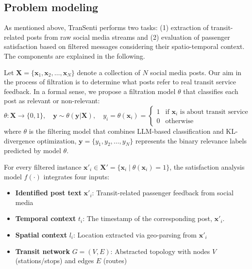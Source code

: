 \documentclass[a4paper,fleqn,12pt]{cas-sc}
\begin{document}
\subsection{Problem modeling}\label{sec:preliminaries}
As mentioned above, TranSenti performs two tasks: (1) extraction of transit-related posts from raw social media streams and (2) evaluation of passenger satisfaction based on filtered messages considering their spatio-temporal context. The components are explained in the following.

Let $\boldsymbol{X} = \{\boldsymbol{x}_1, \boldsymbol{x}_2, \ldots, \boldsymbol{x}_N\}$ denote a collection of $N$ social media posts. Our aim in the process of filtration is to determine what posts refer to real transit service feedback. In a formal sense, we propose a filtration model $\theta$ that classifies each post as relevant or non-relevant:
\begin{equation}
\theta: \boldsymbol{X} \rightarrow \{0,1\}, \quad \boldsymbol{y}\sim\theta(\boldsymbol{y}|\boldsymbol{X}),\quad y_{i}=\theta(\boldsymbol{x}_{i}) = 
\begin{cases} 
1 & \text{if } \boldsymbol{x}_{i} \text{ is about transit service} \\
0 & \text{otherwise}
\end{cases}
\end{equation}
where \(\theta\) is the filtering model that combines LLM-based classification and KL-divergence optimization, $\boldsymbol{y} = \{y_1, y_2, \ldots, y_N\}$ represents the binary relevance labels predicted by model $\theta$.

For every filtered instance \( \boldsymbol{x}'_{i} \in \boldsymbol{X}' = \{\boldsymbol{x}_{i} \mid \theta(\boldsymbol{x}_{i})=1\} \), the satisfaction analysis model $f(\cdot)$ integrates four inputs:
\begin{itemize}
    \item \textbf{Identified post text} $\boldsymbol{x}'_{i}$: Transit-related passenger feedback from social media
    \item \textbf{Temporal context} $t_{i}$: The timestamp of the corresponding post, $\boldsymbol{x}'_{i}$.
    \item \textbf{Spatial context} $l_{i}$: Location extracted via geo-parsing from $\boldsymbol{x}'_{i}$
    \item \textbf{Transit network} $G=(V,E)$: Abstracted topology with nodes $V$ (stations/stops) and edges \(E\) (routes)
\end{itemize}
\end{document}
